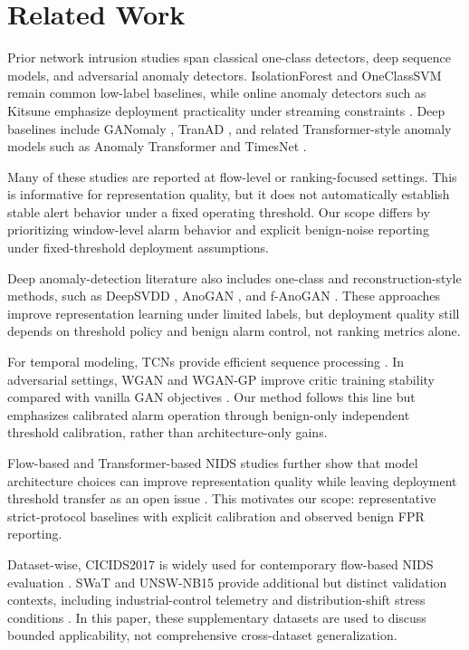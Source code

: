 \section{Related Work}

Prior network intrusion studies span classical one-class detectors, deep sequence models, and adversarial anomaly detectors. IsolationForest \cite{liu2008iforest} and OneClassSVM \cite{scholkopf2001ocsvm} remain common low-label baselines, while online anomaly detectors such as Kitsune emphasize deployment practicality under streaming constraints \cite{mirsky2018kitsune}. Deep baselines include GANomaly \cite{akcay2018ganomaly}, TranAD \cite{tuli2022tranad}, and related Transformer-style anomaly models such as Anomaly Transformer and TimesNet \cite{xu2022anomalytransformer,wu2023timesnet}.

Many of these studies are reported at flow-level or ranking-focused settings. This is informative for representation quality, but it does not automatically establish stable alert behavior under a fixed operating threshold. Our scope differs by prioritizing window-level alarm behavior and explicit benign-noise reporting under fixed-threshold deployment assumptions.

Deep anomaly-detection literature also includes one-class and reconstruction-style methods, such as DeepSVDD \cite{ruff2018deep}, AnoGAN \cite{schlegl2017anogan}, and f-AnoGAN \cite{schlegl2019fanogan}. These approaches improve representation learning under limited labels, but deployment quality still depends on threshold policy and benign alarm control, not ranking metrics alone.

For temporal modeling, TCNs provide efficient sequence processing \cite{bai2018tcn}. In adversarial settings, WGAN and WGAN-GP improve critic training stability compared with vanilla GAN objectives \cite{goodfellow2014gan,arjovsky2017wgan,gulrajani2017wgangp}. Our method follows this line but emphasizes calibrated alarm operation through benign-only independent threshold calibration, rather than architecture-only gains.

Flow-based and Transformer-based NIDS studies further show that model architecture choices can improve representation quality while leaving deployment threshold transfer as an open issue \cite{manocchio2024flowtransformer,long2024transformercloud,xi2024multiscale}. This motivates our scope: representative strict-protocol baselines with explicit calibration and observed benign FPR reporting.

Dataset-wise, CICIDS2017 is widely used for contemporary flow-based NIDS evaluation \cite{sharafaldin2018cicids}. SWaT and UNSW-NB15 provide additional but distinct validation contexts, including industrial-control telemetry and distribution-shift stress conditions \cite{goh2016swat,moustafa2015unsw}. In this paper, these supplementary datasets are used to discuss bounded applicability, not comprehensive cross-dataset generalization.

